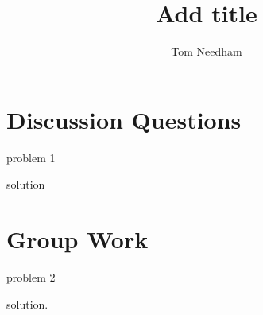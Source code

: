 \documentclass[]{ximera}
\author{Tom Needham}
\title[Collaborate:]{Add title}
\begin{document}
\begin{abstract}
\end{abstract}
\maketitle

\section{Discussion Questions}

\begin{problem}
problem 1
\begin{solution}
solution
\end{solution}
\end{problem}

\section{Group Work}

\begin{problem}
problem 2
\begin{solution}
solution.
\end{solution}
\end{problem}
\end{document}
